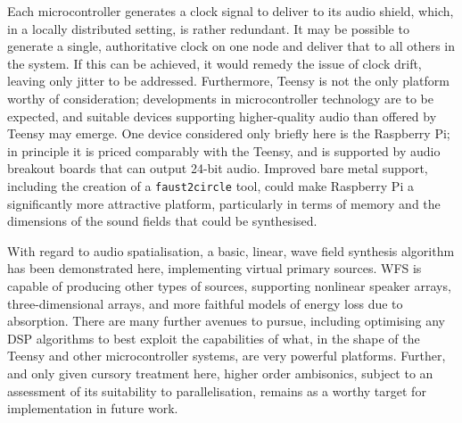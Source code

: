 Each microcontroller generates a clock signal to deliver to its audio shield,
which, in a locally distributed setting, is rather redundant.
It may be possible to generate a single, authoritative clock on one node and
deliver that to all others in the system.
If this can be achieved, it would remedy the issue of clock drift, leaving only
jitter to be addressed.
Furthermore, Teensy is not the only platform worthy of consideration;
developments in microcontroller technology are to be expected, and suitable
devices supporting higher-quality audio than offered by Teensy may emerge.
One device considered only briefly here is the Raspberry Pi;
in principle it is priced comparably with the Teensy, and is supported by audio
breakout boards that can output 24-bit audio.
Improved bare metal support, including the creation of a \texttt{faust2circle}
tool, could make Raspberry Pi a significantly more attractive platform,
particularly in terms of memory and the dimensions of the sound fields that
could be synthesised.

With regard to audio spatialisation, a basic, linear, wave field synthesis
algorithm has been demonstrated here, implementing virtual primary sources.
WFS is capable of producing other types of sources, supporting nonlinear
speaker arrays, three-dimensional arrays, and more faithful models of
energy loss due to absorption.
There are many further avenues to pursue, including optimising any DSP
algorithms to best exploit the capabilities of what, in the shape of the
Teensy and other microcontroller systems, are very powerful platforms.
Further, and only given cursory treatment here, higher order ambisonics, subject
to an assessment of its suitability to parallelisation, remains as a worthy
target for implementation in future work.
